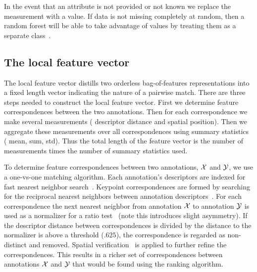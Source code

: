 In the event that an attribute is not provided or not known we replace the
  measurement with a \nan{} value.
If data is not missing completely at random, then a random forest will be able
  to take advantage of \nan{} values by treating them as a separate
  class~\cite{ding_investigation_2010}.


\subsection{The local feature vector}
The local feature vector distills two orderless bag-of-features
  representations into a fixed length vector indicating the nature of a pairwise
  match.
There are three steps needed to construct the local feature vector.
First we determine feature correspondences between the two annotations.
Then for each correspondence we make several measurements (\eg{} descriptor
  distance and spatial position).
Then we aggregate these measurements over all correspondences using summary
  statistics (\eg{} mean, sum, std).
Thus the total length of the feature vector is the number of measurements
  times the number of summary statistics used.

To determine feature correspondences between two annotations, $\mathcal{X}$ and $\mathcal{Y}$, we
  use a one-vs-one matching algorithm.
Each annotation's descriptors are indexed for fast nearest neighbor
  search~\cite{muja_fast_2009}.
Keypoint correspondences are formed by searching for the reciprocal nearest
  neighbors between annotation descriptors~\cite{qin_hello_2011}.
For each correspondence the next nearest neighbor from annotation $\mathcal{X}$ to
  annotation $\mathcal{Y}$ is used as a normalizer for a ratio
  test~\cite{lowe_distinctive_2004} (note this introduces slight asymmetry).
If the descriptor distance between correspondences is divided by the distance
  to the normalizer is above a threshold ($.625$), the correspondence is
  regarded as non-distinct and removed.
Spatial verification~\cite{philbin_object_2007} is applied to further refine
  the correspondences.
This results in a richer set of correspondences between annotations $\mathcal{X}$ and
  $\mathcal{Y}$ that would be found using the ranking algorithm.

